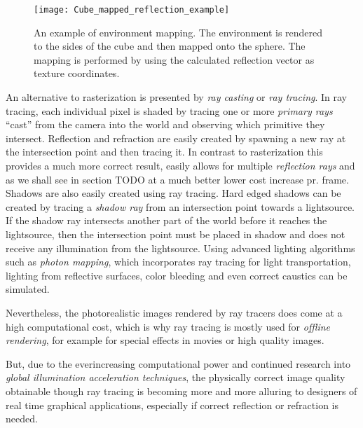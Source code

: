 \begin{figure}
  \centering
  \texttt{[image: Cube\_mapped\_reflection\_example]}
  \caption{An example of environment mapping. The environment is
    rendered to the sides of the cube and then mapped onto the sphere.
    The mapping is performed by using the calculated reflection vector
    as texture coordinates.}
  \label{fig:cubemap}
\end{figure}

An alternative to rasterization is presented by \textit{ray casting}
or \textit{ray tracing}. In ray tracing, each individual pixel is
shaded by tracing one or more \textit{primary rays} ``cast'' from the
camera into the world and observing which primitive they
intersect. Reflection and refraction are easily created by spawning a
new ray at the intersection point and then tracing it. In contrast to
rasterization this provides a much more correct result, easily allows
for multiple \textit{reflection rays} and as we shall see in section
TODO at a much better lower cost increase pr. frame. Shadows are also
easily created using ray tracing. Hard edged shadows can be created by
tracing a \textit{shadow ray} from an intersection point towards a
lightsource. If the shadow ray intersects another part of the world
before it reaches the lightsource, then the intersection point must be
placed in shadow and does not receive any illumination from the
lightsource. Using advanced lighting algorithms such as \textit{photon
  mapping}, which incorporates ray tracing for light transportation,
lighting from reflective surfaces, color bleeding and even correct
caustics can be simulated.


Nevertheless, the photorealistic images rendered by ray tracers does
come at a high computational cost, which is why ray tracing is mostly
used for \textit{offline rendering}, for example for special effects in
movies or high quality images.



But, due to the everincreasing computational power and continued
research into \textit{global illumination acceleration techniques},
the physically correct image quality obtainable though ray tracing is
becoming more and more alluring to designers of real time graphical
applications, especially if correct reflection or refraction is
needed.

